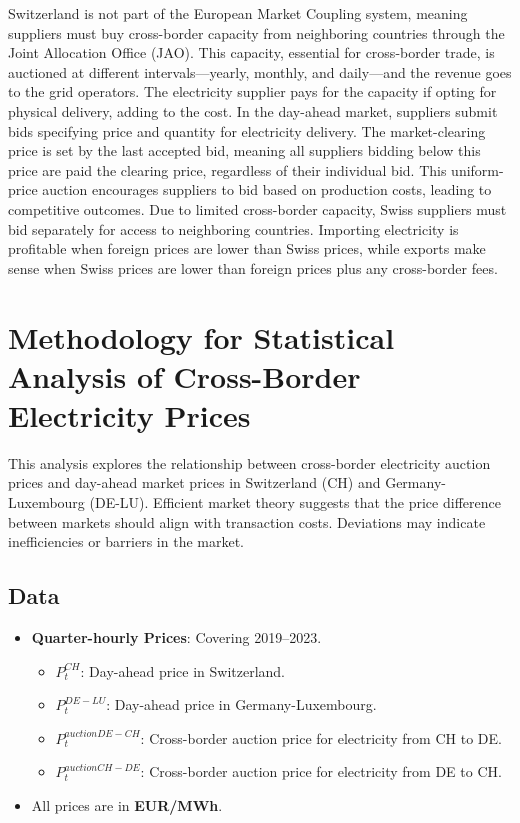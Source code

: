 \documentclass[12pt]{article}
\begin{document}
\noindent Switzerland is not part of the European Market Coupling system, meaning suppliers must buy cross-border capacity from neighboring countries through the Joint Allocation Office (JAO). This capacity, essential for cross-border trade, is auctioned at different intervals—yearly, monthly, and daily—and the revenue
goes to the grid operators. The electricity supplier pays for the capacity if opting for physical delivery, adding to the cost. In the day-ahead market, suppliers submit bids specifying price and quantity for electricity delivery. The market-clearing price is set by the last accepted bid, meaning all suppliers bidding below this price are paid the clearing price, regardless of their individual bid. This uniform-price auction encourages suppliers to bid based on production costs,
leading to competitive outcomes. Due to limited cross-border capacity,
Swiss suppliers must bid separately for access to neighboring countries.
Importing electricity is profitable when foreign prices are lower than Swiss
prices, while exports make sense when Swiss prices are lower than foreign
prices plus any cross-border fees.

\section{Methodology for Statistical Analysis of Cross-Border Electricity Prices}
This analysis explores the relationship between cross-border electricity auction prices and day-ahead market prices in Switzerland (CH) and Germany-Luxembourg (DE-LU). Efficient market theory suggests that the price difference between markets should align with transaction costs. Deviations may indicate inefficiencies or barriers in the market.\\

\subsection{Data}

\begin{itemize}
    \item \textbf{Quarter-hourly Prices}: Covering 2019--2023.
    \begin{itemize}
        \item $P_t^{CH}$: Day-ahead price in Switzerland.
        \item $P_t^{DE-LU}$: Day-ahead price in Germany-Luxembourg.
        \item $P_t^{auction DE-CH}$: Cross-border auction price for electricity from CH to DE.
        \item $P_t^{auction CH-DE}$: Cross-border auction price for electricity from DE to CH.
    \end{itemize}
    \item All prices are in \textbf{EUR/MWh}.
\end{itemize}
\end{document}
